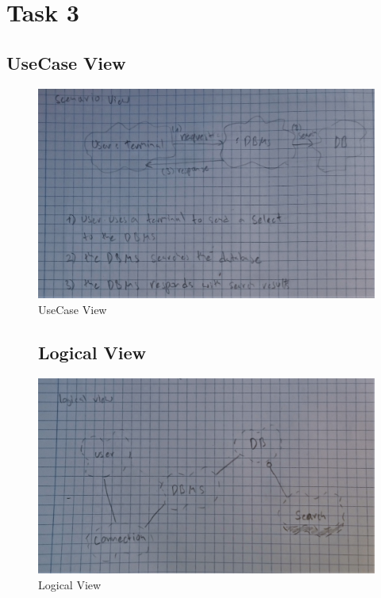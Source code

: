 \chapter{Task 3}
\section{UseCase View}
\begin{figure}[hbt]
  \includegraphics[width=\textwidth]{Immagini/IMG_20230604_171749.jpg}
  \caption{UseCase View}
\end{figure}


\begin{figure}[hbt]
\section{Logical View}
  \includegraphics[width=\textwidth]{Immagini/IMG_20230604_17asdfg1749.jpg}
  \caption{Logical View}
\end{figure}


